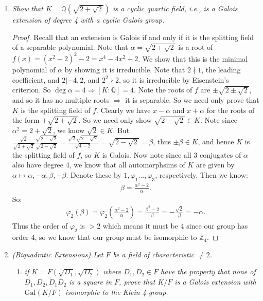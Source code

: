 \documentclass[10pt,oneside,reqno]{amsart}
\theoremstyle{plain}
\theoremstyle{definition}
\theoremstyle{remark}
\theoremstyle{plain}
\newcommand{\z}{\mathbb{Z}}
\newcommand{\Q}{\mathbb{Q}}
\newcommand{\bee}{\begin{equation}\begin{aligned}}
\newcommand{\eee}{\end{aligned}\end{equation}}
\newcommand{\fracc}{\frac}
\newcommand{\lpar}{\left(}
\newcommand{\rpar}{\right)}
\newcommand{\gal}{\text{Gal}}
\newcommand{\qwe}{\sqrt}
\renewcommand{\phi}{\varphi}
\begin{document}
\begin{enumerate}[label=\arabic*.]
\item \textit{Show that $K = \Q(\qwe{2 + \qwe{2}})$ is a cyclic quartic field, i.e., is a Galois extension of degree 4 with a cyclic Galois group. }

\begin{proof}
Recall that an extension is Galois if and only if it is the splitting field of a separable polynomial. Note that $\alpha = \qwe{2 + \qwe{2}}$ is a root of $f(x) = (x^2 - 2)^2 - 2 = x^4 - 4x^2 + 2$. We show that this is the minimal polynomial of $\alpha$ by showing it is irreducible. Note that $2 \nmid 1$, the leading coefficient, and $2|-4,2$, and $2^2\nmid 2$, so it is irreducible by Eisenstein's criterion. So $\deg \alpha = 4 \Rightarrow [K:\Q] = 4$. Note the roots of $f$ are $\pm \qwe{2 \pm \qwe{2}}$, and so it has no multiple roots $\Rightarrow$ it is separable. So we need only prove that $K$ is the splitting field of $f$. Clearly we have $x - \alpha$ and $x + \alpha$ for the roots of the form $\pm\qwe{2 + \qwe{2}}$. So we need only show $\qwe{2 - \qwe{2}} \in K$. Note since $\alpha^2 = 2 + \qwe{2}$, we know $\qwe{2} \in K$. But $\fracc{\qwe{2}}{\qwe{2 + \qwe{2}}} \fracc{\qwe{2 - \qwe{2}}}{\qwe{2 - \qwe{2}}} = \fracc{\qwe{2}\qwe{2 - \qwe{2}}}{\qwe{4 - 2}} =\qwe{2 - \qwe{2}} = \beta$, thus $\pm\beta \in K$, and hence $K$ is the splitting field of $f$, so $K$ is Galois. Now note since all 3 conjugates of $\alpha$ also have degree 4, we know that all automorphsims of $K$ are given by $\alpha \mapsto \alpha,-\alpha, \beta, -\beta$. Denote these by $1,\phi_1...,\phi_3$, respectively. Then we know:
\bee
\beta = \fracc{\alpha^2 - 2}{\alpha}.
\eee
So:
\bee
\phi_2(\beta) = \phi_2\lpar\fracc{\alpha^2 - 2}{\alpha}\rpar = \fracc{\beta^2 - 2}{
\beta} = -\fracc{\qwe{2}}{\beta} = -\alpha.
\eee
Thus the order of $\phi_2$ is $> 2$ which means it must be 4 since our group has order 4, so we know that our group must be isomorphic to $\z_4$.
\end{proof}

\item \textit{(Biquadratic Extensions) Let $F$ be a field of characteristic $\neq 2$. }
\begin{enumerate}
\item \textit{if $K = F(\qwe{D_1},\qwe{D_2})$ where $D_1,D_2 \in F$ have the property that none of $D_1,D_2,D_1D_2$ is a square in $F$, prove that $K/F$ is a Galois extension with $\gal(K/F)$ isomorphic to the Klein 4-group. }


\end{enumerate}
\end{enumerate}
\end{document}
